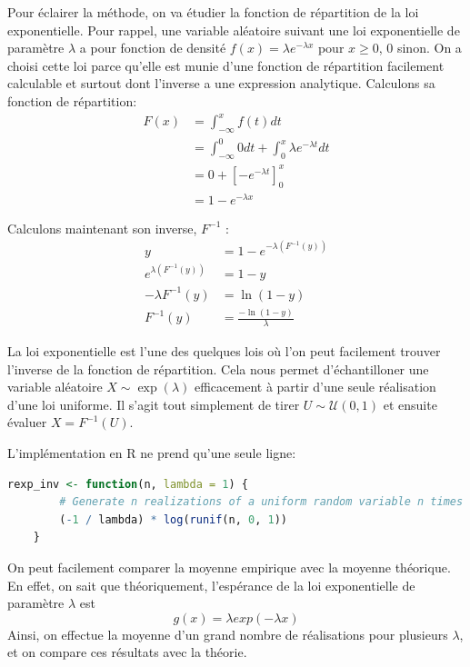 \documentclass[10pt]{article} %
\begin{document}
Pour éclairer la méthode, on va étudier la fonction de répartition de la loi exponentielle. Pour rappel, une variable aléatoire suivant une loi exponentielle de paramètre
$\lambda$ a pour fonction de densité $f(x) = \lambda e^{-\lambda x}$ pour $x \geq 0$, $0$ sinon. On a choisi cette loi parce qu'elle est munie d'une fonction de répartition facilement calculable
et surtout dont l'inverse a une expression analytique. Calculons sa fonction de répartition:
\begin{align*}
    F(x) &= \int_{-\infty}^xf(t)dt \\
    & = \int_{-\infty}^0 0 dt + \int_0^x \lambda e^{-\lambda t} dt \\
    &= 0 + \left[-e^{-\lambda t}\right]_0^x \\
    &= 1 - e^{-\lambda x}
\end{align*}

Calculons maintenant son inverse, $F^{-1}$ :
\begin{align*}
    y &= 1 - e^{-\lambda (F^{-1}(y))} \\
    e^{\lambda (F^{-1}(y))} &= 1 - y \\
    -\lambda F^{-1}(y) &= \ln(1 - y) \\
    F^{-1}(y) &= \frac{-\ln(1 - y)}{\lambda}
\end{align*}

La loi exponentielle est l'une des quelques lois où l'on peut facilement trouver l'inverse de la fonction de répartition. Cela nous permet
d'échantilloner une variable aléatoire $X \sim \exp(\lambda)$ efficacement à partir d'une seule réalisation d'une loi uniforme. Il s'agit tout
simplement de tirer $U \sim \mathcal{U}(0, 1)$ et ensuite évaluer $X = F^{-1}(U)$.

L'implémentation en R ne prend qu'une seule ligne:

\begin{lstlisting}[language=R]
    rexp_inv <- function(n, lambda = 1) {
        # Generate n realizations of a uniform random variable n times
        (-1 / lambda) * log(runif(n, 0, 1))
    }
\end{lstlisting}

On peut facilement comparer la moyenne empirique avec la moyenne théorique. En effet, on sait que théoriquement, l'espérance de la loi exponentielle de paramètre $\lambda$ est $$g(x)=\lambda exp(-\lambda x)$$ Ainsi, on effectue la moyenne d'un grand nombre de réalisations pour plusieurs $\lambda$,  et on compare ces résultats avec la théorie. 
\end{document}
